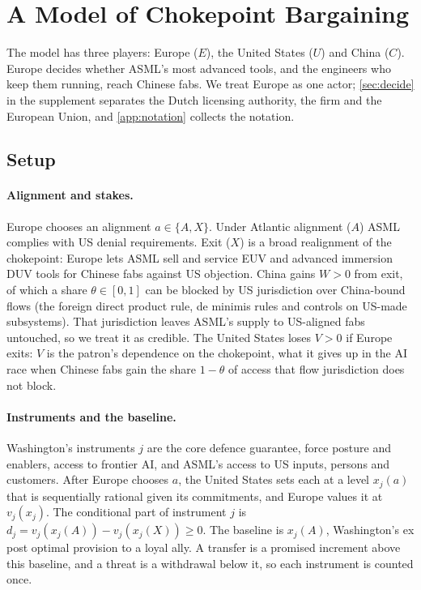 \section{A Model of Chokepoint Bargaining}\label{sec:model}

The model has three players: Europe ($E$), the United States ($U$) and China ($C$). Europe decides whether ASML's most advanced tools, and the engineers who keep them running, reach Chinese fabs. We treat Europe as one actor; \cref{sec:decide} in the supplement separates the Dutch licensing authority, the firm and the European Union, and \cref{app:notation} collects the notation.

\subsection{Setup}\label{sec:setup}

\paragraph{Alignment and stakes.} Europe chooses an alignment $a\in\{A,X\}$. Under Atlantic alignment ($A$) ASML complies with US denial requirements. Exit ($X$) is a broad realignment of the chokepoint: Europe lets ASML sell and service EUV and advanced immersion DUV tools for Chinese fabs against US objection. China gains $W>0$ from exit, of which a share $\theta\in[0,1]$ can be blocked by US jurisdiction over China-bound flows (the foreign direct product rule, de minimis rules and controls on US-made subsystems). That jurisdiction leaves ASML's supply to US-aligned fabs untouched, so we treat it as credible. The United States loses $V>0$ if Europe exits: $V$ is the patron's dependence on the chokepoint, what it gives up in the AI race when Chinese fabs gain the share $1-\theta$ of access that flow jurisdiction does not block.

\paragraph{Instruments and the baseline.} Washington's instruments $j$ are the core defence guarantee, force posture and enablers, access to frontier AI, and ASML's access to US inputs, persons and customers. After Europe chooses $a$, the United States sets each at a level $x_j(a)$ that is sequentially rational given its commitments, and Europe values it at $v_j(x_j)$. The conditional part of instrument $j$ is $d_j=v_j(x_j(A))-v_j(x_j(X))\ge 0$. The baseline is $x_j(A)$, Washington's ex post optimal provision to a loyal ally. A transfer is a promised increment above this baseline, and a threat is a withdrawal below it, so each instrument is counted once.

